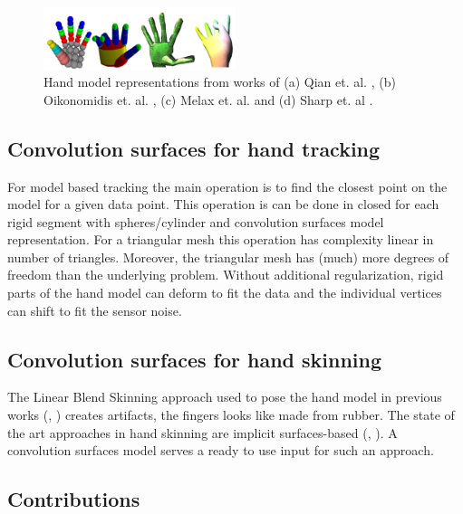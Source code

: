 \documentclass[10pt,journal,a4paper]{IEEEtran}
\begin{document}
\begin{figure}[h!] 
	\centering
	\hspace{-2em}
	\includegraphics[width=0.5\textwidth]{figures/hand_model_representations}
	\caption{Hand model representations from works of (a) Qian et. al. \cite{qian2014realtime}, (b)  Oikonomidis et. al. \cite{oikonomidis2014evolutionary}, (c) Melax et. al. \cite{melax2013dynamics} and (d) Sharp et. al \cite{sharp2015accurate}.}
	\label{fig:hand_model_representations}
\end{figure}

\subsection{Convolution surfaces for hand tracking}
For model based tracking the main operation is to find the closest point on the model for a given data point. This operation is can be done in closed for each rigid segment with spheres/cylinder and convolution surfaces model representation. For a triangular mesh this operation has complexity linear in number of triangles. Moreover, the triangular mesh has (much) more degrees of freedom than the underlying problem. Without additional regularization, rigid parts of the hand model can deform to fit the data and the individual vertices can shift to fit the sensor noise.

\subsection{Convolution surfaces for hand skinning}
The Linear Blend Skinning approach used to pose the hand model in previous works (\cite{sharp2015accurate}, \cite{schroder2013analysis} ) creates artifacts, the fingers looks like made from rubber. The state of the art approaches in hand skinning are implicit surfaces-based (\cite{vaillant2013implicit},  \cite{vaillant2014robust} ). A convolution surfaces model serves a ready to use input for such an approach.

\subsection{Contributions}
\end{document}
